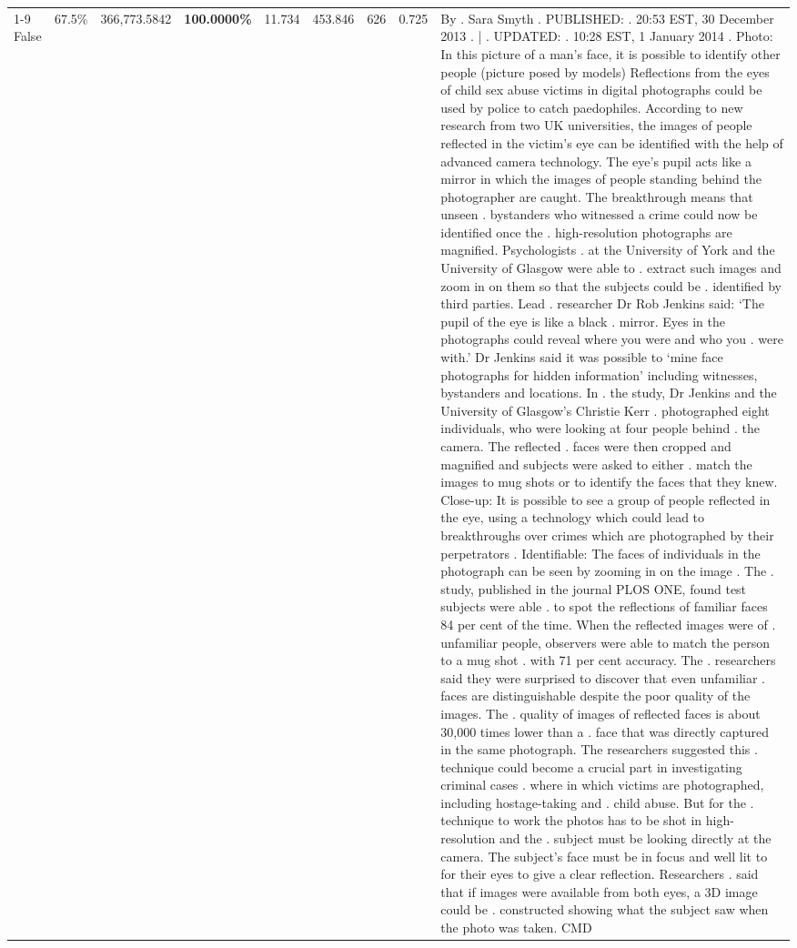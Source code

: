 \begin{table}[H]
\begin{tabular}{lllrlllll}
\cline{1-9}
False & 67.5\% & 366,773.5842 & \bfseries \color{red} 100.0000\% & 11.734 & 453.846 & 626 & 0.725 & By . Sara Smyth . PUBLISHED: . 20:53 EST, 30 December 2013 . | . UPDATED: . 10:28 EST, 1 January 2014 . Photo: In this picture of a man's face, it is possible to identify other people (picture posed by models) Reflections from the eyes of child sex abuse victims in digital photographs could be used by police to catch paedophiles. According to new research from two UK universities, the images of people reflected in the victim's eye can be identified with the help of advanced camera technology. The eye's pupil acts like a mirror in which the images of people standing behind the photographer are caught. The breakthrough means that unseen . bystanders who witnessed a crime could now be identified once the . high-resolution photographs are magnified. Psychologists . at the University of York and the University of Glasgow were able to . extract such images and zoom in on them so that the subjects could be . identified by third parties. Lead . researcher Dr Rob Jenkins said: ‘The pupil of the eye is like a black . mirror. Eyes in the photographs could reveal where you were and who you . were with.' Dr Jenkins said it was possible to ‘mine face photographs for hidden information' including witnesses, bystanders and locations. In . the study, Dr Jenkins and the University of Glasgow's Christie Kerr . photographed eight individuals, who were looking at four people behind . the camera. The reflected . faces were then cropped and magnified and subjects were asked to either . match the images to mug shots or to identify the faces that they knew. Close-up: It is possible to see a group of people reflected in the eye, using a technology which could lead to breakthroughs over crimes which are photographed by their perpetrators . Identifiable: The faces of individuals in the photograph can be seen by zooming in on the image . The . study, published in the journal PLOS ONE, found test subjects were able . to spot the reflections of familiar faces 84 per cent of the time. When the reflected images were of . unfamiliar people, observers were able to match the person to a mug shot . with 71 per cent accuracy. The . researchers said they were surprised to discover that even unfamiliar . faces are distinguishable despite the poor quality of the images. The . quality of images of reflected faces is about 30,000 times lower than a . face that was directly captured in the same photograph. The researchers suggested this . technique could become a crucial part in investigating criminal cases . where in which victims are photographed, including hostage-taking and . child abuse. But for the . technique to work the photos has to be shot in high-resolution and the . subject must be looking directly at the camera. The subject's face must be in focus and well lit to for their eyes to give a clear reflection. Researchers . said that if images were available from both eyes, a 3D image could be . constructed showing what the subject saw when the photo was taken. CMD \\

\end{tabular}
\end{table}
